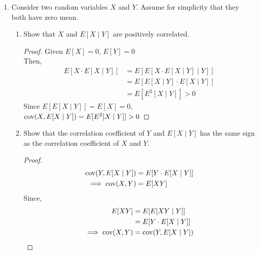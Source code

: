 \documentclass[paper=usletter, fontsize=12pt]{article}
\begin{document}
\begin{enumerate}
\begin{enumerate}
\begin{proof}
                Therefore, $\var{X} \ge \var{\max\{0,X\}}+\var{\max\{0,-X\}}$
                \qedhere

            \end{proof}

        \end{enumerate}

        \item Consider two random variables $X$ and $Y$. Assume for simplicity
        that they both have zero mean.
        \begin{enumerate}

            \item Show that $X$ and $E[X\mid Y]$ are positively correlated.
            \begin{proof}

                Given $E[X]=0$, $E[Y]=0$\\
                Then,
                \begin{align*}
                    E[X\cdot E[X\mid Y]] & = E[E[X\cdot E[X\mid Y] \mid Y]] \\
                    & = E[E[X\mid Y]\cdot E[X\mid Y]] \\
                    & = E[E^2[X\mid Y]] > 0
                \end{align*}
                Since $E[E[X\mid Y]]=E[X]=0$,\\
                $\operatorname{cov}(X,E[X\mid Y]) = E[E^2[X\mid Y]] > 0$ \qedhere

            \end{proof}

            \item Show that the correlation coefficient of $Y$ and $E[X\mid Y]$
            has the same sign as the correlation coefficient of $X$ and $Y$.
            \begin{proof}

                \begin{align*}
                    \operatorname{cov}(Y,E[X\mid Y]) & = E[Y\cdot E[X\mid Y]] \\
                    \implies \operatorname{cov}(X,Y) & = E[XY]
                \end{align*}
                Since,
                \begin{align*}
                    E[XY] & = E[E[XY\mid Y]] \\
                    & = E[Y\cdot E[X\mid Y]]\\
                    \implies \operatorname{cov}(X,Y) & = \operatorname{cov}(Y,E[X\mid Y]) \qedhere
                \end{align*}

            \end{proof}

        \end{enumerate}

    \end{enumerate}
\end{document}
